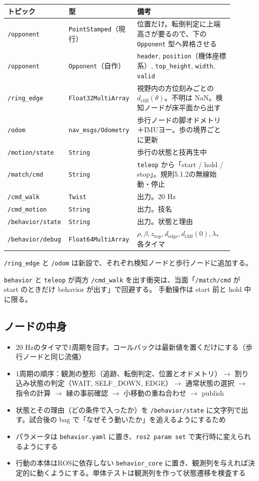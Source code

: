 \documentclass[a4paper,11pt]{ltjsarticle}
\newcommand{\code}[1]{\texttt{#1}}
\begin{document}
\begin{center}\footnotesize
\begin{tabular}{p{0.2\linewidth}p{0.28\linewidth}p{0.42\linewidth}}
\toprule
トピック & 型 & 備考 \\
\midrule
\code{/opponent} & \code{PointStamped}（現行） & 位置だけ。転倒判定に上端高さが要るので、下の \code{Opponent} 型へ昇格させる \\
\code{/opponent} & \code{Opponent}（自作） & \code{header}, \code{position}（機体座標系）, \code{top\_height}, \code{width}, \code{valid} \\
\code{/ring\_edge} & \code{Float32MultiArray} & 視野内の方位刻みごとの $d_\mathrm{cliff}(\theta)$。不明は NaN。検知ノードが床平面から出す \\
\code{/odom} & \code{nav\_msgs/Odometry} & 歩行ノードの脚オドメトリ＋IMUヨー。歩の境界ごとに更新 \\
\code{/motion/state} & \code{String} & 歩行の状態と技再生中 \\
\code{/match/cmd} & \code{String} & \code{teleop} から「start / hold / stop」。規則5.1.2の無線始動・停止 \\
\code{/cmd\_walk} & \code{Twist} & 出力。20 Hz \\
\code{/cmd\_motion} & \code{String} & 出力。技名 \\
\code{/behavior/state} & \code{String} & 出力。状態と理由 \\
\code{/behavior/debug} & \code{Float64MultiArray} & $\rho,\beta,z_\mathrm{top},d_\mathrm{edge},d_\mathrm{cliff}(0),\lambda$、各タイマ \\
\bottomrule
\end{tabular}
\end{center}
\code{/ring\_edge} と \code{/odom} は新設で、それぞれ検知ノードと歩行ノードに追加する。

\code{behavior} と \code{teleop} が両方 \code{/cmd\_walk} を出す衝突は、当面「\code{/match/cmd} が start のときだけ behavior が出す」で回避する。
手動操作は start 前と hold 中に限る。

\subsection{ノードの中身}

\begin{itemize}
\item 20 Hzのタイマで1周期を回す。コールバックは最新値を置くだけにする（歩行ノードと同じ流儀）
\item 1周期の順序：観測の整形（追跡、転倒判定、位置とオドメトリ）$\to$ 割り込み状態の判定（WAIT, SELF\_DOWN, EDGE）$\to$ 通常状態の選択 $\to$ 指令の計算 $\to$ 縁の事前確認 $\to$ 小移動の重ね合わせ $\to$ publish
\item 状態とその理由（どの条件で入ったか）を \code{/behavior/state} に文字列で出す。試合後の bag で「なぜそう動いたか」を追えるようにするため
\item パラメータは \code{behavior.yaml} に置き、\code{ros2 param set} で実行時に変えられるようにする
\item 行動の本体はROSに依存しない \code{behavior\_core} に置き、観測列を与えれば決定的に動くようにする。単体テストは観測列を作って状態遷移を検査する
\end{itemize}
\end{document}
